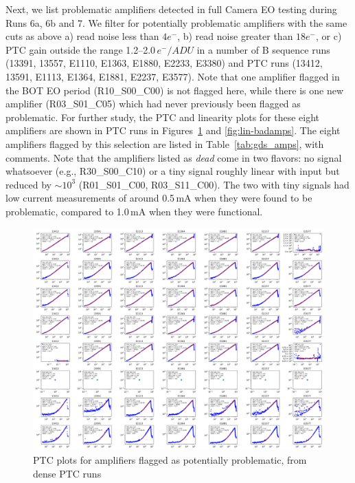 Next, we list problematic amplifiers detected in full Camera EO testing during Runs 6a, 6b and 7. We filter for potentially problematic amplifiers with the same cuts as above a) read noise less than $4e^{-}$, b) read noise greater than $18e^{-}$, or c) PTC gain outside the range 1.2--2.0\,$e^{-}/ADU$ in a number of B sequence runs (13391, 13557, E1110, E1363, E1880, E2233, E3380) and PTC runs (13412, 13591, E1113, E1364, E1881, E2237, E3577).  Note that one amplifier flagged in the BOT EO period (R10\_S00\_C00) is not flagged here, while there is one new amplifier (R03\_S01\_C05) which had never previously been flagged as problematic.  For further study, the PTC and linearity plots for these eight amplifiers are shown in PTC runs in Figures~\ref{fig:ptc-badamps} and \ref{fig:lin-badamps}. The eight amplifiers flagged by this selection are listed in Table~\ref{tab:gds_amps}, with comments.  Note that the amplifiers listed as {\it dead} come in two flavors: no signal whatsoever (e.g., R30\_S00\_C10) or a tiny signal roughly linear with input but reduced by $\sim10^3$ (R01\_S01\_C00, R03\_S11\_C00). The two with tiny signals had low current measurements of around 0.5\,mA when they were found to be problematic, compared to 1.0\,mA when they were functional.

\begin{figure}[ht]
    \centering
    \includegraphics[width=0.95\linewidth]{figures/ptc_badamps.png}
    \caption{PTC plots for amplifiers flagged as potentially problematic, from dense PTC runs}
    \label{fig:ptc-badamps}
\end{figure}


